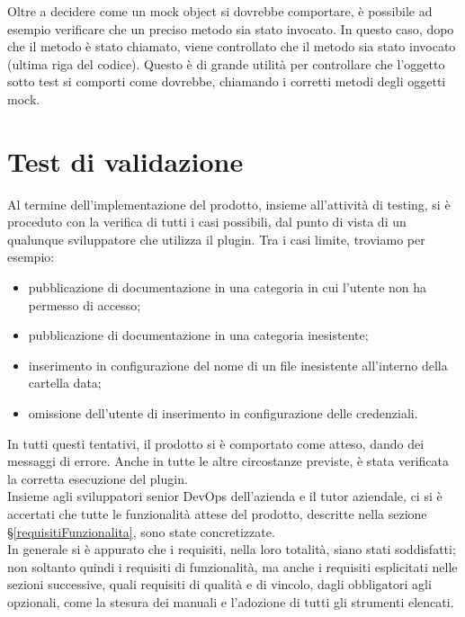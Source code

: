     Oltre a decidere come un mock object si dovrebbe comportare, è possibile ad esempio verificare che un preciso metodo sia stato invocato.
    In questo caso, dopo che il metodo  è stato chiamato, viene controllato che il metodo  sia stato invocato (ultima riga del codice).
    Questo è di grande utilità per controllare che l'oggetto sotto test si comporti come dovrebbe, chiamando i corretti metodi degli oggetti mock.


\section{Test di validazione}
Al termine dell'implementazione del prodotto, insieme all'attività di testing, si è proceduto con la verifica di tutti i casi possibili, dal punto di vista di un qualunque sviluppatore che utilizza il plugin.
Tra i casi limite, troviamo per esempio:
\begin{itemize}
    \item pubblicazione di documentazione in una categoria in cui l'utente non ha permesso di accesso;
    \item pubblicazione di documentazione in una categoria inesistente;
    \item inserimento in configurazione del nome di un file inesistente all'interno della cartella data;
    \item omissione dell'utente di inserimento in configurazione delle credenziali.
\end{itemize}
In tutti questi tentativi, il prodotto si è comportato come atteso, dando dei messaggi di errore.
Anche in tutte le altre circostanze previste, è stata verificata la corretta esecuzione del plugin. \\

Insieme agli sviluppatori senior DevOps dell'azienda e il tutor aziendale, ci si è accertati che tutte le funzionalità attese del prodotto, descritte nella sezione \S\ref{requisitiFunzionalita}, sono state concretizzate. \\
In generale si è appurato che i requisiti, nella loro totalità, siano stati soddisfatti; non soltanto quindi i requisiti di funzionalità, ma anche i requisiti esplicitati nelle sezioni successive, quali requisiti di qualità e di vincolo, dagli obbligatori agli opzionali, come la stesura dei manuali e l'adozione di tutti gli strumenti elencati.


